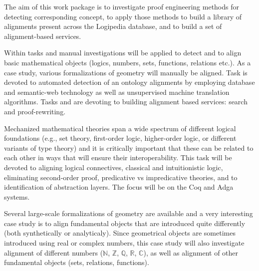 \begin{workpackage}[id=alignment,type=RTD,wphases=1-48,
  short={Proof engineering},%
  title={Proof engineering},
  lead=Lee,
  LeeRM=12,  %
  StrRM=18,  %
  BelRM=18,  %
  ImtRM=6,  %
  InnRM=6,  %
  SacRM=6,  %
  FauRM=11, %
  BolRM=13, %
  InrRM=6   %
  ]

  \begin{wpobjectives}
    The aim of this work package is to investigate proof engineering
    methods for detecting corresponding concept, to apply those methods
    to build a library of alignments present across the Logipedia
    database, and to build a set of alignment-based services.
  \end{wpobjectives}

  \begin{wpdescription}
    Within tasks  and
     manual investigations will be
    applied to detect and to align basic mathematical objects (logics,
    numbers, sets, functions, relations etc.). As a case study,
    various formalizations of geometry will manually be aligned. Task
     is devoted to automated detection of
    an ontology alignments by employing database and semantic-web
    technology as well as unsupervised machine translation algorithms.
    Tasks  and 
    are devoting to building alignment based services: search and
    proof-rewriting.
  \end{wpdescription}

\begin{tasklist}
  \begin{task}[id=alignlogic,title=Logical foundations,shorttitle=Found.,lead=Lee,LeeRM=12,wphases=6-24!.67]
    Mechanized mathematical theories span a wide spectrum of different
    logical foundations (e.g., set theory, first-order logic,
    higher-order logic, or different variants of type theory) and it
    is critically important that these can be related to each other in
    ways that will ensure their interoperability. This task will be
    devoted to aligning logical connectives, classical and
    intuitionistic logic, eliminating second-order proof, predicative
    vs impredicative theories, and to identification of abstraction
    layers. The focus will be on the Coq and Adga systems.
  \end{task}
  
  \begin{task}[id=aligncasestudies,title=Case study: geometry,shorttitle=Cases,lead=Str,StrRM=18,BelRM=18,wphases=6-42!1]
    Several large-scale formalizations of geometry are available and a
    very interesting case study is to align fundamental objects that
    are introduced quite differently (both synthetically or
    analyticaly). Since geometrical objects are sometimes introduced
    using real or complex numbers, this case study will also
    investigate alignment of different numbers ($\mathbb{N}$,
    $\mathbb{Z}$, $\mathbb{Q}$, $\mathbb{R}$, $\mathbb{C}$), as well
    as alignment of other fundamental objects (sets, relations,
    functions).
  \end{task}


\end{tasklist}
\end{workpackage}
